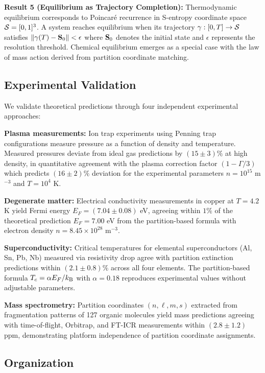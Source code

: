 \textbf{Result 5 (Equilibrium as Trajectory Completion):} Thermodynamic equilibrium corresponds to Poincaré recurrence in S-entropy coordinate space $\mathcal{S} = [0,1]^3$. A system reaches equilibrium when its trajectory $\gamma: [0,T] \to \mathcal{S}$ satisfies $\|\gamma(T) - \mathbf{S}_0\| < \epsilon$ where $\mathbf{S}_0$ denotes the initial state and $\epsilon$ represents the resolution threshold. Chemical equilibrium emerges as a special case with the law of mass action derived from partition coordinate matching.

\subsection{Experimental Validation}

We validate theoretical predictions through four independent experimental approaches:

\textbf{Plasma measurements:} Ion trap experiments using Penning trap configurations measure pressure as a function of density and temperature. Measured pressures deviate from ideal gas predictions by $(15 \pm 3)\%$ at high density, in quantitative agreement with the plasma correction factor $(1 - \Gamma/3)$ which predicts $(16 \pm 2)\%$ deviation for the experimental parameters $n = 10^{15}$ m$^{-3}$ and $T = 10^4$ K.

\textbf{Degenerate matter:} Electrical conductivity measurements in copper at $T = 4.2$ K yield Fermi energy $E_F = (7.04 \pm 0.08)$ eV, agreeing within $1\%$ of the theoretical prediction $E_F = 7.00$ eV from the partition-based formula with electron density $n = 8.45 \times 10^{28}$ m$^{-3}$.

\textbf{Superconductivity:} Critical temperatures for elemental superconductors (Al, Sn, Pb, Nb) measured via resistivity drop agree with partition extinction predictions within $(2.1 \pm 0.8)\%$ across all four elements. The partition-based formula $T_c = \alpha E_F/k_{\mathrm{B}}$ with $\alpha = 0.18$ reproduces experimental values without adjustable parameters.

\textbf{Mass spectrometry:} Partition coordinates $(n,\ell,m,s)$ extracted from fragmentation patterns of 127 organic molecules yield mass predictions agreeing with time-of-flight, Orbitrap, and FT-ICR measurements within $(2.8 \pm 1.2)$ ppm, demonstrating platform independence of partition coordinate assignments.

\subsection{Organization}

